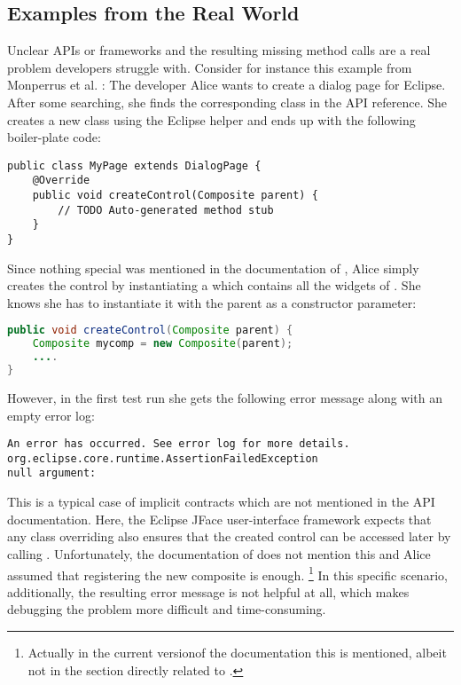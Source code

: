 \subsection{Examples from the Real World}
Unclear APIs or frameworks and the resulting missing method calls are a real problem developers struggle with.
Consider for instance this example from Monperrus et al. \cite{monperrus2010detecting}:
The developer Alice wants to create a dialog page for Eclipse.
After some searching, she finds the corresponding class  in the API reference.
She creates a new class using the Eclipse helper and ends up with the following boiler-plate code:
\begin{lstlisting}
public class MyPage extends DialogPage {
    @Override
    public void createControl(Composite parent) {
        // TODO Auto-generated method stub
    }
}
\end{lstlisting}
Since nothing special was mentioned in the documentation of , Alice simply creates the control by instantiating a  which contains all the widgets of .
She knows she has to instantiate it with the parent as a constructor parameter:
\begin{lstlisting}[language=java]
public void createControl(Composite parent) {
    Composite mycomp = new Composite(parent);
    ....
}
\end{lstlisting}
However, in the first test run she gets the following error message along with an empty error log:
\begin{lstlisting}
An error has occurred. See error log for more details.
org.eclipse.core.runtime.AssertionFailedException
null argument:
\end{lstlisting}
This is a typical case of implicit contracts which are not mentioned in the API documentation.
Here, the Eclipse JFace user-interface framework expects that any class overriding  also ensures that the created control can be accessed later by calling .
Unfortunately, the documentation of  does not mention this and Alice assumed that registering the new composite is enough.%
\footnote{Actually in the current version\footnotemark of the documentation this is mentioned, albeit not in the section directly related to .}
In this specific scenario, additionally, the resulting error message is not helpful at all, which makes debugging the problem more difficult and time-consuming.

